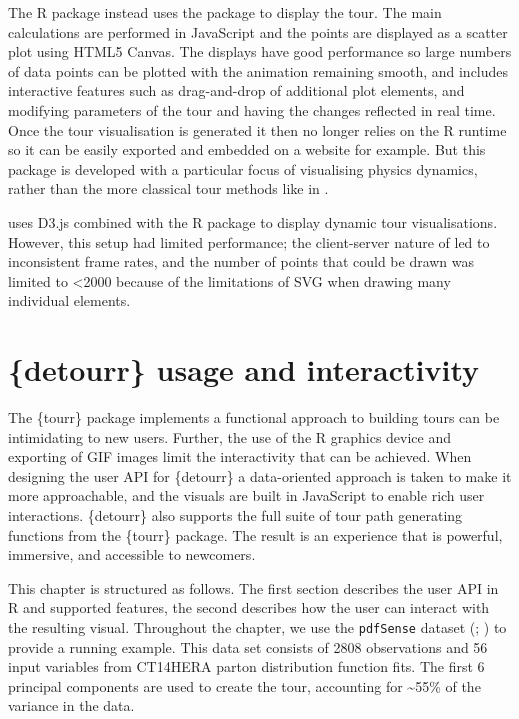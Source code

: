 The  R package instead uses the
 package \citep{htmlwidgets} to display the tour.
The main calculations are performed in JavaScript and the points are
displayed as a scatter plot using HTML5 Canvas. The displays have good
performance so large numbers of data points can be plotted with the
animation remaining smooth, and includes interactive features such as
drag-and-drop of additional plot elements, and modifying parameters of
the tour and having the changes reflected in real time. Once the tour
visualisation is generated it then no longer relies on the R runtime so
it can be easily exported and embedded on a website for example. But
this package is developed with a particular focus of visualising physics
dynamics, rather than the more classical tour methods like in
.

\citep{kipp2019connecting} uses D3.js \citep{bostock2011d3} combined
with the R  \citep{shiny} package to display dynamic tour
visualisations. However, this setup had limited performance; the
client-server nature of  led to inconsistent frame rates,
and the number of points that could be drawn was limited to
\textless2000 because of the limitations of SVG when drawing many
individual elements.

\pagebreak

\hypertarget{ch:implementation}{%
\section{\{detourr\} usage and interactivity}\label{ch:implementation}}

The \{tourr\} package implements a functional approach to building tours
can be intimidating to new users. Further, the use of the R graphics
device and exporting of GIF images limit the interactivity that can be
achieved. When designing the user API for \{detourr\} a data-oriented
approach is taken to make it more approachable, and the visuals are
built in JavaScript to enable rich user interactions. \{detourr\} also
supports the full suite of tour path generating functions from the
\{tourr\} package. The result is an experience that is powerful,
immersive, and accessible to newcomers.

This chapter is structured as follows. The first section describes the
user API in R and supported features, the second describes how the user
can interact with the resulting visual. Throughout the chapter, we use
the \texttt{pdfSense} dataset (\citet{wang2018mapping};
\citet{lee2021liminal}) to provide a running example. This data set
consists of 2808 observations and 56 input variables from CT14HERA
parton distribution function fits. The first 6 principal components are
used to create the tour, accounting for \textasciitilde55\% of the
variance in the data.

